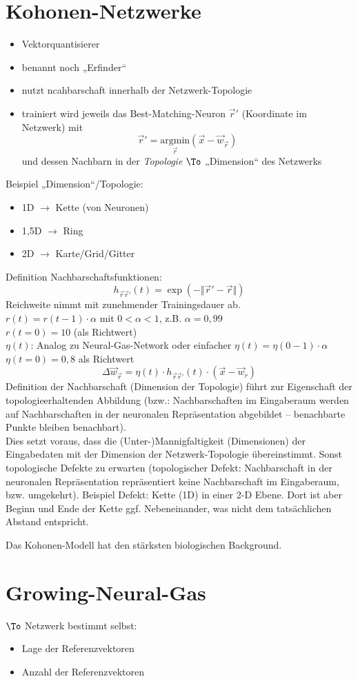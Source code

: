 \section{Kohonen-Netzwerke}
\begin{itemize}
\item Vektorquantisierer
\item benannt noch „Erfinder“
\item nutzt ncahbarschaft innerhalb der Netzwerk-Topologie
\item trainiert wird jeweils das Best-Matching-Neuron $\vec{r}'$ (Koordinate im Netzwerk) mit
$$\vec{r}'=\underset{\vec{r}}{\mathrm{argmin}}(\vec{x}-\vec{w}_{\vec{r}})$$
und dessen Nachbarn in der \emph{Topologie} $\To$ „Dimension“ des Netzwerks
\end{itemize}
Beispiel „Dimension“/Topologie: 
\begin{itemize}
\item 1D $\to$ Kette (von Neuronen)
\item 1,5D $\to$ Ring
\item 2D $\to$ Karte/Grid/Gitter
\end{itemize}
Definition Nachbarschaftsfunktionen:
$$h_{\vec{r}\vec{r}'}(t) = \exp (-\Vert\vec{r}'-\vec{r}\Vert)$$
Reichweite nimmt mit zunehmender Trainingsdauer ab.\\
$r(t)=r(t-1)\cdot \alpha$ mit $0<\alpha<1$, z.B. $\alpha=0,99$\\
$r(t=0)=10$ (als Richtwert)\\
$\eta(t)$: Analog zu Neural-Gas-Network oder einfacher $\eta(t)=\eta(0-1)\cdot \alpha$\\
$\eta(t=0)=0,8$ als Richtwert
$$\Delta \vec{w}_{\vec{r}} = \eta(t) \cdot h_{\vec{r}\vec{r}'}(t)\cdot (\vec{x}-\vec{w}_r)$$
Definition der Nachbarschaft (Dimension der Topologie) führt zur Eigenschaft der topologieerhaltenden Abbildung (bzw.: Nachbarschaften im Eingaberaum werden auf Nachbarschaften in der neuronalen Repräsentation abgebildet -- benachbarte Punkte bleiben benachbart).\\
Dies setzt voraus, dass die (Unter-)Mannigfaltigkeit (Dimensionen) der Eingabedaten mit der Dimension der Netzwerk-Topologie übereinstimmt. Sonst topologische Defekte zu erwarten (topologischer Defekt: Nachbarschaft in der neuronalen Repräsentation repräsentiert keine Nachbarschaft im Eingaberaum, bzw. umgekehrt). Beispiel Defekt: Kette (1D) in einer 2-D Ebene. Dort ist aber Beginn und Ende der Kette ggf. Nebeneinander, was nicht dem tatsächlichen Abstand entspricht.

Das Kohonen-Modell hat den stärksten biologischen Background.

\section{Growing-Neural-Gas}
$\To$ Netzwerk bestimmt selbst:
\begin{itemize}
\item Lage der Referenzvektoren
\item Anzahl der Referenzvektoren
\end{itemize}




